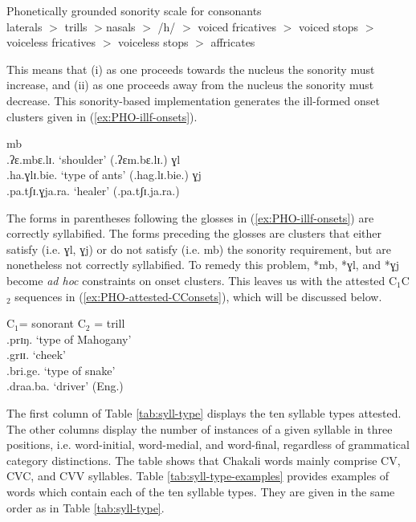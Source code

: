 \begin{exe}
\ex\label{ex:sonority-slope}{Phonetically grounded sonority scale for
consonants   \citep[236]{Park02}}\\
 laterals $>$
trills $>$nasals $>$ /h/ $>$ voiced fricatives $>$ voiced stops $>$ voiceless
fricatives $>$ voiceless stops $>$ affricates
\end{exe}

This means that  (i) as one
proceeds towards the nucleus the sonority must increase, and (ii) as one 
proceeds away from the nucleus the sonority must  decrease.   This 
sonority-based implementation  generates the ill-formed onset clusters
given in (\ref{ex:PHO-illf-onsets}).  


\begin{exe}
\ex\label{ex:PHO-illf-onsets}
\begin{xlist}
\ex *mb \\
 .ʔɛ.mbɛ.lɪ.		{\rm `shoulder'}    (.ʔɛm.bɛ.lɪ.)
\ex *ɣl\\
 .ha.ɣlɪ.bie.		{\rm`type of ants'}   (.hag.lɪ.bie.)	
\ex *ɣj\\
 .pa.tʃɪ.ɣja.ra.	{\rm`healer'}  (.pa.tʃɪ.ja.ra.)


\end{xlist}
\end{exe}

The forms in parentheses following the glosses in  (\ref{ex:PHO-illf-onsets}) 
are correctly 
syllabified. The forms preceding the glosses are clusters that either satisfy 
(i.e. ɣl, ɣj) or do not satisfy  (i.e. mb)  the sonority requirement, but are 
nonetheless not correctly syllabified. To remedy  this problem,   *mb, *ɣl,  and 
*ɣj  become {\it ad hoc} constraints on onset clusters. This leaves us with the 
attested C$_{1}$C$_{2}$ sequences in (\ref{ex:PHO-attested-CConsets}), which 
will be discussed below.  


\begin{exe}
\ex\label{ex:PHO-attested-CConsets}{C$_{1}$= {\sc sonorant} C$_{2}$ = {\sc
trill}}\\ 
.prɪŋ.	  	`type of Mahogany'\\
	 .grɪɪ.		  `cheek'\\
.bri.ge.	 	  `type of snake'\\
	.draa.ba.	  `driver' (Eng.)\\
\end{exe}


The first column of Table   \ref{tab:syll-type} displays the ten syllable types
attested.  The other columns display the number of instances of a given
syllable in three positions, i.e.  word-initial, word-medial, and word-final, 
regardless of  grammatical category distinctions. The table shows that Chakali 
words  mainly comprise CV, CVC, and CVV syllables. Table 
\ref{tab:syll-type-examples} provides examples of words which contain each of 
the ten syllable types. They are given in the same order as in Table 
\ref{tab:syll-type}.  


